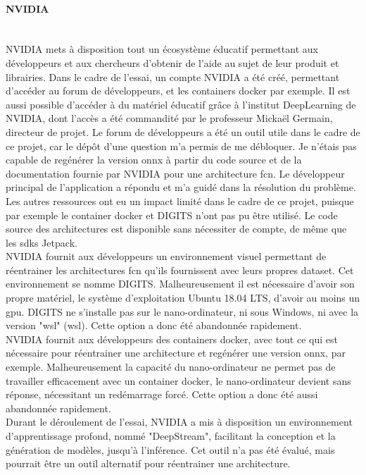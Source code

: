 \paragraph{NVIDIA}
\vspace{\baselineskip}
\\
\noindent NVIDIA mets à disposition tout un écosystème éducatif permettant aux développeurs et aux chercheurs d'obtenir de l'aide au sujet de leur produit et librairies. Dans le cadre de l'essai, un compte NVIDIA a été créé, permettant d'accéder au forum de développeurs, et les containers docker par exemple. Il est aussi possible d'accéder à du matériel éducatif grâce à l'institut DeepLearning de NVIDIA, dont l'accès a été commandité par le professeur Mickaël Germain, directeur de projet. Le forum de développeurs a été un outil utile dans le cadre de ce projet, car le dépôt d'une question m'a permis de me débloquer. Je n'étais pas capable de regénérer la version \acrshort{onnx} à partir du code source et de la documentation fournie par NVIDIA pour une architecture \acrshort{fcn}. Le développeur principal de l'application a répondu et m'a guidé dans la résolution du problème. Les autres ressources ont eu un impact limité dans le cadre de ce projet, puisque par exemple le container docker et DIGITS n'ont pas pu être utilisé. Le code source des architectures est disponible sans nécessiter de compte, de même que les \acrshort{sdk}s Jetpack.
\vspace{\baselineskip}
\\
\noindent NVIDIA fournit aux développeurs un environnement visuel permettant de réentrainer les architectures \acrshort{fcn} qu'ils fournissent avec leurs propres dataset. Cet environnement se nomme DIGITS. Malheureusement il est nécessaire d'avoir son propre matériel, le système d'exploitation Ubuntu 18.04 LTS, d'avoir au moins un \acrshort{gpu}. DIGITS ne s'installe pas sur le nano-ordinateur, ni sous Windows, ni avec la version "\acrshort{wsl}" (\acrlong{wsl}). Cette option a donc été abandonnée rapidement. 
\vspace{\baselineskip}
\\
\noindent NVIDIA fournit aux développeurs des containers docker, avec tout ce qui est nécessaire pour réentrainer une architecture et regénérer une version \acrshort{onnx}, par exemple. Malheureusement la capacité du nano-ordinateur ne permet pas de travailler efficacement avec un container docker, le nano-ordinateur devient sans réponse, nécessitant un redémarrage forcé. Cette option a donc été aussi abandonnée rapidement. 
\vspace{\baselineskip}
\\
\noindent Durant le déroulement de l'essai, NVIDIA a mis à disposition un environnement d'apprentissage profond, nommé "DeepStream", facilitant la conception et la génération de modèles, jusqu'à l'inférence. Cet outil n'a pas été évalué, mais pourrait être un outil alternatif pour réentrainer une architecture.